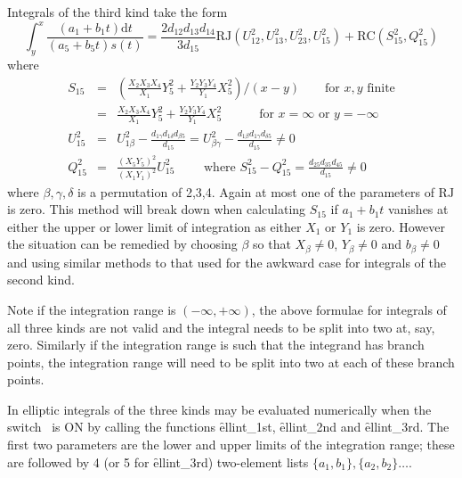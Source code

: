 Integrals of the third kind take the form
\[\int_y^x\frac{(a_1+b_1t)\mathrm{d}t}{(a_5+b_5t)s(t)} = \frac{2d_{12}d_{13}
d_{14}}{3d_{15}}\mathrm{RJ}(U_{12}^2, U_{13}^2, U_{23}^2,U_{15}^2) +
\mathrm{RC}(S_{15}^2,Q_{15}^2)\]
where
\begin{eqnarray*}
S_{15}  &=& \left(\frac{X_2X_3X_4}{X_1}Y_5^2+\frac{Y_2Y_3Y_4}{Y_1}X_5^2\right)/(x-y) \qquad
\mbox{for }x,y\mbox{ finite}\\
&=& \frac{X_2X_3X_4}{X_1}Y_5^2+\frac{Y_2Y_3Y_4}{Y_1}X_5^2 \quad \qquad \mbox{for }
x = \infty \mbox{ or } y = -\infty \\
U_{15}^2 &=& U_{1\beta}^2-\frac{d_{1\gamma}d_{1\delta}d_{\beta 5}}{d_{15}}
= U_{\beta\gamma}^2-\frac{d_{1\beta}d_{1\gamma}d_{\delta 5}}{d_{15}} \neq 0\\
Q_{15}^2 &=& \frac{(X_5Y_5)^2}{(X_1Y_1)^2}U_{15}^2\qquad\mbox{ where }
S_{15}^2-Q_{15}^2 = \frac{d_{25}d_{35}d_{45}}{d_{15}} \neq 0
\end{eqnarray*}
where $\beta,\gamma,\delta$ is a permutation of 2,3,4. Again at most one of the
parameters of $\mathrm{RJ}$ is zero. This method will break down when calculating
$S_{15}$ if $a_1+b_1t$ vanishes at either the upper or lower limit of integration as
either $X_1$ or $Y_1$ is zero. However the situation can be remedied by choosing $\beta$
so that $X_\beta \neq 0$, $Y_\beta \neq 0$ and $b_\beta \neq 0$ and using similar
methods to that used for the awkward case for integrals of the second kind.

Note if the integration range is $(-\infty, +\infty)$, the above formulae for
integrals of all three kinds are not valid and the integral needs to be split
into two at, say, zero.
Similarly if the integration range is such that the integrand has branch points,
the integration range will need to be split into two at each of these branch
points.

In \REDUCE elliptic integrals of the three kinds may be evaluated numerically
when the switch \ is ON by calling the functions
\f{ellint\_1st},  \f{ellint\_2nd} and \f{ellint\_3rd}. The first two
parameters are the lower and upper limits of the integration range; these are
followed by 4 (or 5 for \f{ellint\_3rd}) two-element lists
$\{a_1,b_1\}, \{a_2,b_2\} \ldots$.


